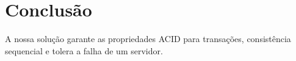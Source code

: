 \section{Conclusão}
A nossa solução garante as propriedades ACID para transações, consistência sequencial e tolera a falha de um servidor.